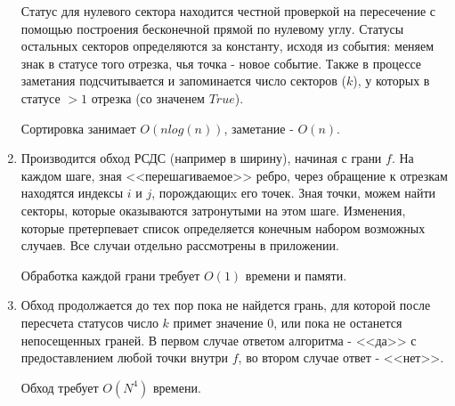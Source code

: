 \documentclass[letterpaper,12pt]{article}
\begin{document}
\begin{enumerate}
            Статус для нулевого сектора находится честной проверкой на 
            пересечение с помощью построения бесконечной прямой по нулевому
            углу. Статусы остальных секторов определяются за константу,
            исходя из события: меняем знак в статусе того отрезка, чья
            точка - новое событие. Также в процессе заметания 
            подсчитывается и запоминается число секторов ($k$), у которых
            в статусе $>1$ отрезка (со значенем $True$). 
            \par
            Сортировка занимает $O(nlog(n))$, заметание - $O(n)$.
      \item Производится обход РСДС (например в ширину), начиная с грани $f$.
            На каждом шаге, зная <<перешагиваемое>> ребро, через обращение к 
            отрезкам находятся индексы $i$ и $j$, порождающиx его точек.
            Зная точки, можем найти секторы, которые оказываются затронутыми
            на этом шаге.
            Изменения, которые претерпевает список определяется конечным
            набором возможных случаев. Все случаи отдельно рассмотрены в
            приложении.
            \par
            Обработка каждой грани требует $O(1)$ времени и памяти. 
      \item Обход продолжается до тех пор пока не найдется грань, 
            для которой после пересчета статусов число $k$ примет значение $0$,
            или пока не останется непосещенных граней. В первом случае ответом 
            алгоритма - <<да>> с предоставлением любой точки внутри $f$, 
            во втором случае ответ - <<нет>>.
            \par
            Обход требует $O(N^4)$ времени.
\end{enumerate}
\end{document}
